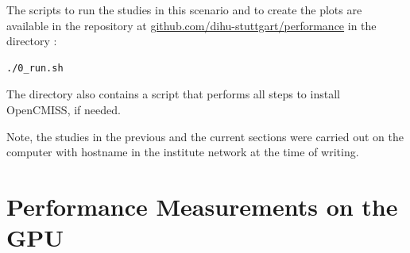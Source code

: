 % 
% 



\begin{reproduce_no_break}
  The scripts to run the studies in this scenario and to create the plots are available in the repository at \href{https://github.com/dihu-stuttgart/performance}{github.com/dihu-stuttgart/performance}
  in the directory :
  \begin{lstlisting}[columns=fullflexible,breaklines=true,postbreak=\mbox{\textcolor{gray}{$\hookrightarrow$}\space}]
    ./0_run.sh
  \end{lstlisting}
  The directory also contains a script that performs all steps to install OpenCMISS, if needed. 
  
  Note, the studies in the previous and the current sections were carried out on the computer with hostname  in the institute network at the time of writing.
\end{reproduce_no_break}



\section{Performance Measurements on the GPU}\label{sec:performance_gpu}

